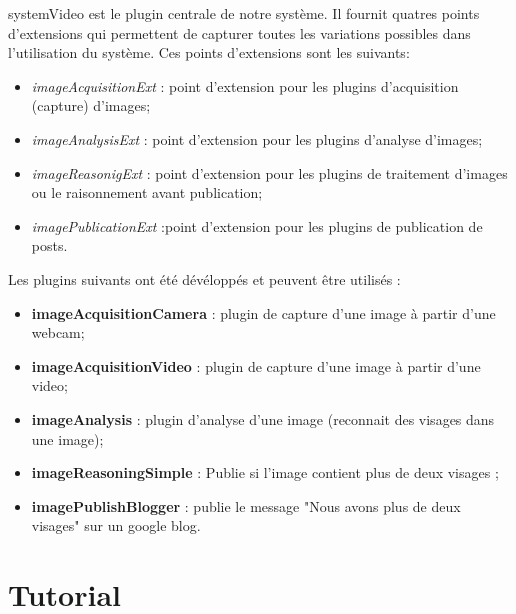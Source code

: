 \documentclass[a4paper , 12pt]{article}
\begin{document}
systemVideo est le plugin centrale de notre système. Il fournit quatres points d'extensions qui permettent de capturer toutes les variations possibles dans l'utilisation du système. Ces points d'extensions sont les suivants:
 
\begin{itemize}
\item {\it imageAcquisitionExt} : point d'extension pour les plugins d'acquisition (capture) d'images; 
\item {\it imageAnalysisExt} : point d'extension pour les plugins d'analyse d'images;
\item {\it imageReasonigExt} : point d'extension pour les plugins de traitement d'images ou le raisonnement avant publication; 
\item {\it imagePublicationExt} :point d'extension pour les plugins de publication de posts.
\end{itemize}  
Les plugins suivants ont été dévéloppés et peuvent être utilisés : 
\begin{itemize}
\item {\bf imageAcquisitionCamera} : plugin de capture d'une image à partir d'une webcam; 
\item {\bf imageAcquisitionVideo} :  plugin de capture d'une image à partir d'une video;
\item {\bf imageAnalysis} : plugin d'analyse d'une image (reconnait des visages dans une image); 
\item {\bf imageReasoningSimple} : Publie si l'image contient plus de deux visages ;
\item {\bf imagePublishBlogger} :  publie le message "Nous avons plus de deux visages" sur un google blog.
\end{itemize}  

\part*{Tutorial}
\end{document}
